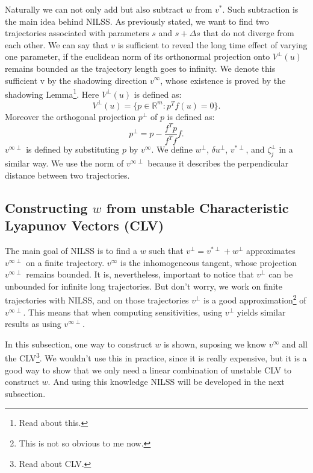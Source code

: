 \documentclass[10pt,twoside,a4paper]{article} %
\begin{document}
Naturally we can not only add but also subtract $w$ from $v^*$. Such subtraction is the main idea behind NILSS. As previously stated, we want to find two trajectories associated with parameters $s$ and $s + \Delta s$ that do not diverge from each other. We can say that $v$ is sufficient to reveal the long time effect of varying one parameter, if the euclidean norm of its orthonormal projection onto $V^\perp (u)$ remains bounded as the trajectory length goes to infinity. We denote this sufficient v by the shadowing direction $v^\infty$, whose existence is proved by the shadowing Lemma\footnote{Read about this.}. Here $V^\perp(u)$ is defined as:
\begin{equation}
  V^\perp(u) = \{ p\in \mathbb{R}^m  : p^T f(u) = 0 \}.
  \label{eq:7}
\end{equation}
Moreover the orthogonal projection $p^\perp$ of $p$ is defined as:
\begin{equation}
  p^\perp = p - \frac{f^T p}{f^Tf}f.
  \label{eq:8}
\end{equation}
$v^{\infty\perp}$ is defined by substituting $p$ by $v^\infty$. We define $w^\perp$, $\delta u ^\perp$, $v^{*\perp}$, and ${\zeta_j^\perp}$ in a similar way. We use the norm of $v^{\infty\perp}$ because it describes the perpendicular distance between two trajectories.
\subsection{Constructing $w$ from unstable Characteristic Lyapunov Vectors (CLV)}\label{3.2}

The main goal of NILSS is to find a $w$ such that $v^\perp = v^{*\perp} + w^\perp$ approximates $v^{\infty \perp}$ on a finite trajectory. $v^\infty$ is the inhomogeneous tangent, whose projection $v^{\infty\perp}$ remains bounded. It is, nevertheless, important to notice that $v^\perp$ can be unbounded for infinite long trajectories. But don't worry, we work on finite trajectories with NILSS, and on those trajectories $v^\perp$ is a good approximation\footnote{This is not so obvious to me now.} of $v^{\infty\perp}$. This means that when computing sensitivities, using $v^\perp$ yields similar results as using $v^{\infty\perp}$.

In this subsection, one way to construct $w$ is shown, suposing we know $v^\infty$ and all the CLV\footnote{Read about CLV.}. We wouldn't use this in practice, since it is really expensive, but it is a good way to show that we only need a linear combination of unstable CLV to construct $w$. And using this knowledge NILSS will be developed in the next subsection.
\end{document}
